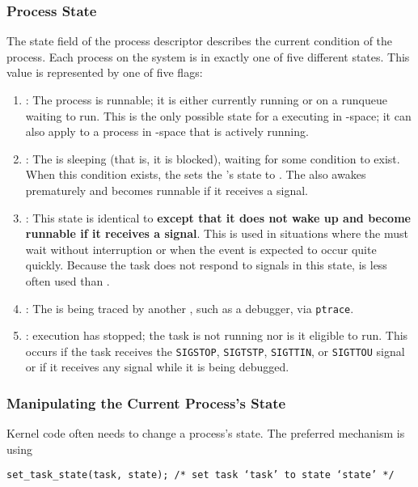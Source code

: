 \subsubsection{Process State}\label{subsubsec:Process_State}
The state field of the process descriptor describes the current condition of the process.
Each process on the system is in exactly one of five different states.
This value is represented by one of five flags:
\begin{enumerate}[noitemsep]
\item {}: The process is runnable; it is either currently running or on a runqueue waiting to run.
  This is the only possible state for a  executing in -space; it can also apply to a process in -space that is actively running.
\item {}: The  is sleeping (that is, it is blocked), waiting for some condition to exist.
  When this condition exists, the  sets the ’s state to .
  The  also awakes prematurely and becomes runnable if it receives a signal.
\item {}: This state is identical to  \textbf{except that it does not wake up and become runnable if it receives a signal}.
  This is used in situations where the  must wait without interruption or when the event is expected to occur quite quickly.
  Because the task does not respond to signals in this state,  is less often used than .
\item {}: The  is being traced by another , such as a debugger, via \texttt{ptrace}.
\item {}:  execution has stopped; the task is not running nor is it eligible to run.
  This occurs if the task receives the \texttt{SIGSTOP}, \texttt{SIGTSTP}, \texttt{SIGTTIN}, or \texttt{SIGTTOU} signal or if it receives any signal while it is being debugged.
\end{enumerate}

\subsubsection{Manipulating the Current Process's State}\label{subsubsec:Manipulate_Current_Process_State}
Kernel code often needs to change a process’s state.
The preferred mechanism is using
\begin{verbatim}
set_task_state(task, state); /* set task ‘task’ to state ‘state’ */
\end{verbatim}

